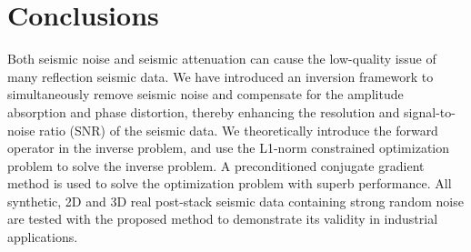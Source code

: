 \section{Conclusions}
Both seismic noise and seismic attenuation can cause the low-quality issue of many reflection seismic data. We have introduced an inversion framework to simultaneously remove seismic noise and compensate for the amplitude absorption and phase distortion, thereby enhancing the resolution and signal-to-noise ratio (SNR) of the seismic data. We theoretically introduce the forward operator in the inverse problem, and use the L1-norm constrained optimization problem to solve the inverse problem. A preconditioned conjugate gradient method is used to solve the optimization problem with superb performance.  All synthetic, 2D and 3D real post-stack seismic data containing strong random noise are tested with the proposed method to demonstrate its validity in industrial applications.


%













